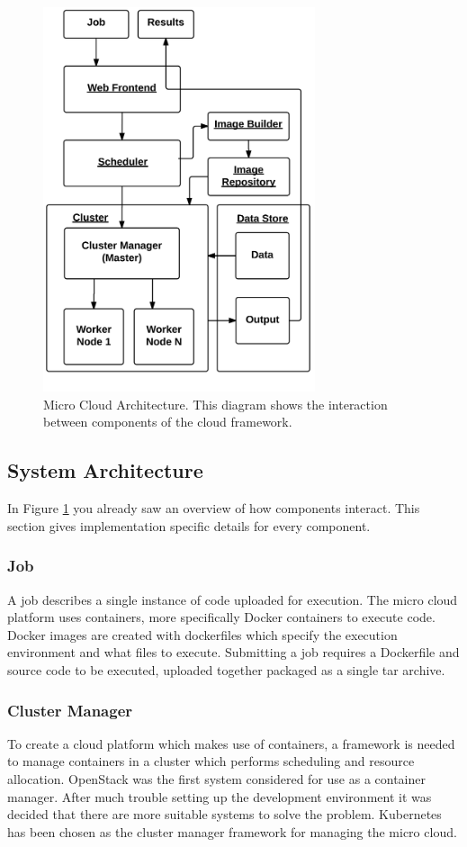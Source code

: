 \documentclass{sig-alternate-05-2015}
\begin{document}
\begin{figure}
\includegraphics[width=8cm]{img/microcloud_architecture}
\caption{Micro Cloud Architecture. This diagram shows the interaction between components of the cloud framework.}
\label{fig:architecture}
\end{figure}

\subsection{System Architecture}
In Figure \ref{fig:architecture} you already saw an overview of how components interact. This section gives implementation specific details for every component.

\subsubsection{Job}
A job describes a single instance of code uploaded for execution. 
The micro cloud platform uses containers, more specifically Docker containers to execute code. Docker images are created with dockerfiles which specify the execution environment and what files to execute. Submitting a job requires a Dockerfile and source code to be executed, uploaded together packaged as a single tar archive.  

\subsubsection{Cluster Manager}
To create a cloud platform which makes use of containers, a framework is needed to manage containers in a cluster which performs scheduling and resource allocation. OpenStack was the first system considered for use as a container manager. After much trouble setting up the development environment it was decided that there are more suitable systems to solve the problem. Kubernetes has been chosen as the cluster manager framework for managing the micro cloud. 
\end{document}
